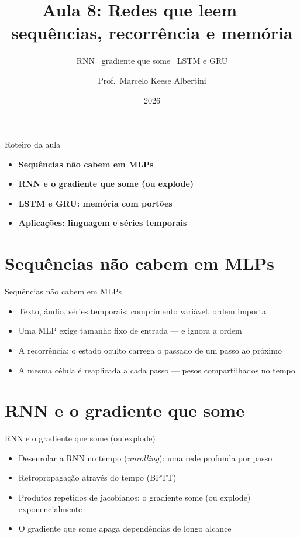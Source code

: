 \documentclass[aspectratio=169, 11pt]{beamer}
\title[Aula 8 — Recorrência]{Aula 8: Redes que leem — sequências, recorrência e memória}
\subtitle[GBC073 — Inteligência Computacional]{RNN \textbullet\ gradiente que some \textbullet\ LSTM e GRU}
\author[Prof.\ Marcelo Albertini]{Prof.\ Marcelo Keese Albertini}
\institute{GBC073 — Inteligência Computacional \textbullet\ Universidade Federal de Uberlândia}
\date{2026}
\begin{document}
\begin{frame}
  \titlepage
\end{frame}

\begin{frame}{Roteiro da aula}
  \begin{itemize}\setlength{\itemsep}{0.5ex}
    \item<1-> \textbf{Sequências não cabem em MLPs}
    \item<2-> \textbf{RNN e o gradiente que some (ou explode)}
    \item<3-> \textbf{LSTM e GRU: memória com portões}
    \item<4-> \textbf{Aplicações: linguagem e séries temporais}
  \end{itemize}
\end{frame}

\section{Sequências não cabem em MLPs}

\begin{frame}{Sequências não cabem em MLPs}
  \begin{itemize}\setlength{\itemsep}{0.4ex}
    \item Texto, áudio, séries temporais: comprimento variável, ordem importa
    \item Uma MLP exige tamanho fixo de entrada — e ignora a ordem
    \item A recorrência: o estado oculto carrega o passado de um passo ao
          próximo
    \item A mesma célula é reaplicada a cada passo — pesos compartilhados no
          tempo
  \end{itemize}
\end{frame}

\section{RNN e o gradiente que some}

\begin{frame}{RNN e o gradiente que some (ou explode)}
  \begin{itemize}\setlength{\itemsep}{0.4ex}
    \item Desenrolar a RNN no tempo (\emph{unrolling}): uma rede profunda por
          passo
    \item Retropropagação através do tempo (BPTT)
    \item Produtos repetidos de jacobianos: o gradiente some (ou explode)
          exponencialmente
    \item O gradiente que some apaga dependências de longo alcance
  \end{itemize}
\end{frame}
\end{document}
